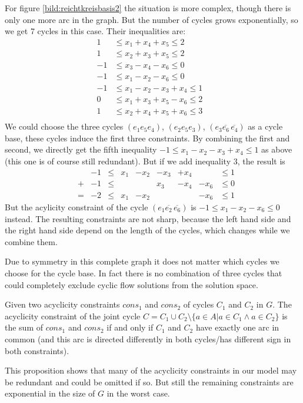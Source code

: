 For figure \ref{bild:reichtkreisbasis2} the situation is more complex, though there is only one more arc in the graph. 
But the number of cycles grows exponentially, so we get 7 cycles in this case. Their inequalities are:
\begin{align*}
 1 &\le x_1+x_4+x_5\le 2&\\
 1&\le x_2+x_3+x_5\le 2& \\%
 -1&\le x_3-x_4-x_6\le 0\\
 -1&\le x_1-x_2-x_6\le 0\\ 
 -1 &\le x_1-x_2-x_3+x_4 \le 1&\\
 0 &\le x_1+x_3+x_5-x_6\le 2\\
 1&\le x_2+x_4+x_5+x_6\le 3\\
\end{align*}
We could choose the three cycles $(e_1 e_5 e_4)$, $(e_2 e_5 e_3)$, $(e_3 \overline{e_6}\, \overline{e_4})$ as a cycle 
base, these cycles induce the first three constraints. By combining the first and second, we directly get the fifth 
inequality $-1 \le x_1-x_2-x_3+x_4 \le 1$ as above (this one is of course still redundant). But if we add inequality 
$3$, the result is 
\begin{align*}
 &&-1 &\le &x_1&-x_2&-x_3&+x_4 &&\le 1\\
 &+&-1&\le &&&x_3&-x_4&-x_6&\le 0\\
 &=&-2&\le&x_1&-x_2&&&-x_6&\le 1
\end{align*}
But the acylicity constraint of the cycle $(e_1 \overline{e_2} \,\overline{e_6})$ is $-1\le x_1-x_2-x_6\le 0$ instead. 
The resulting constraints are not sharp, because the left hand side and the right hand side depend on the length of the 
cycles, which changes while we combine them.

Due to symmetry in this complete graph it does not matter which cycles we choose for the cycle base. In fact there is 
no combination of three cycles that could completely exclude cyclic flow solutions from the solution space.

\begin{prop}
\label{prop:redundantAcyclicityCons}
 Given two acyclicity constraints $cons_1$ and $cons_2$ of cycles $C_1$ and $C_2$ in $G$. The acyclicity constraint of 
the joint cycle $C=C_1\cup C_2 \setminus \{a\in A| a\in C_1\land a\in C_2 \}$ is the sum of $cons_1$ and $cons_2$ if 
and only if $C_1$ and $C_2$ have exactly one arc in common (and this arc is directed differently in both 
cycles/has different sign in both constraints).
\end{prop}
This proposition shows that many of the acyclicity constraints in our model may be redundant and could be omitted if 
so. But still the remaining constraints are exponential in the size of $G$ in the worst case.


